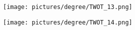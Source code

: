 \begin{figure} \ContinuedFloat
        \centering
        \begin{subfigure}{.49\textwidth}
                \centering
                \texttt{[image: pictures/degree/TWOT\_13.png]}
        \end{subfigure}
        \begin{subfigure}{.49\textwidth}
                \centering
                \texttt{[image: pictures/degree/TWOT\_14.png]}
        \end{subfigure}
\end{figure}
